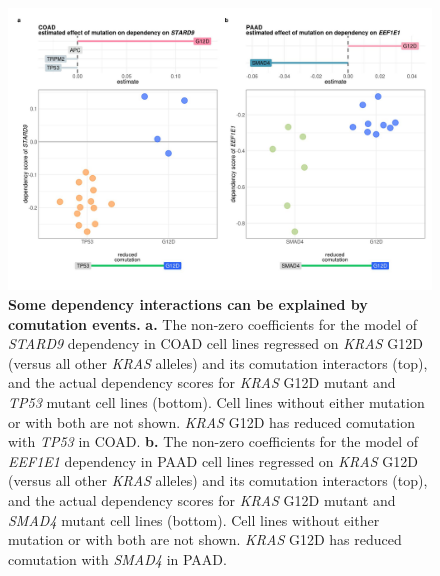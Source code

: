 \documentclass[english, 10pt, letterpaper]{article}
\newcommand{\KRAS}{\emph{KRAS}}
\begin{document}
\begin{figure}[h!]
\centering
\includegraphics[width=180mm]{figures/Fig_5.jpeg}
\caption{
    \textbf{Some dependency interactions can be explained by comutation events.}
    \textbf{a.} The non-zero coefficients for the model of \emph{STARD9} dependency in COAD cell lines regressed on \KRAS{} G12D (versus all other \KRAS{} alleles) and its comutation interactors (top), and the actual dependency scores for \KRAS{} G12D mutant and \emph{TP53} mutant cell lines (bottom). Cell lines without either mutation or with both are not shown. \KRAS{} G12D has reduced comutation with \emph{TP53} in COAD.
    \textbf{b.} The non-zero coefficients for the model of \emph{EEF1E1} dependency in PAAD cell lines regressed on \KRAS{} G12D (versus all other \KRAS{} alleles) and its comutation interactors (top), and the actual dependency scores for \KRAS{} G12D mutant and \emph{SMAD4} mutant cell lines (bottom). Cell lines without either mutation or with both are not shown. \KRAS{} G12D has reduced comutation with \emph{SMAD4} in PAAD.
}
\label{fig:dep-map-comut-masking}
\end{figure}
\newpage
\end{document}
